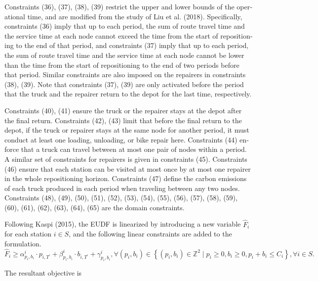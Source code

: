 \documentclass[
  english,
]{article}
\begin{document}
\begin{otherlanguage}{english}
\protect{}\label{p0240}
Constraints (36), (37), (38), (39) restrict the upper and lower bounds of the operational time, and
are modified from the study of Liu et al. (2018). Specifically, constraints (36) imply that up to
each period, the sum of route travel time and the service time at each node cannot exceed the time
from the start of repositioning to the end of that period, and constraints (37) imply that up to
each period, the sum of route travel time and the service time at each node cannot be lower than the
time from the start of repositioning to the end of two periods before that period. Similar
constraints are also imposed on the repairers in constraints (38), (39). Note that constraints (37),
(39) are only activated before the period that the truck and the repairer return to the depot for
the last time, respectively.

\protect{}\label{p0245}
Constraints (40), (41) ensure the truck or the repairer stays at the depot after the final return.
Constraints (42), (43) limit that before the final return to the depot, if the truck or repairer
stays at the same node for another period, it must conduct at least one loading, unloading, or bike
repair here. Constraints (44) enforce that a truck can travel between at most one pair of nodes
within a period. A similar set of constraints for repairers is given in constraints (45).
Constraints (46) ensure that each station can be visited at most once by at most one repairer in the
whole repositioning horizon. Constraints (47) define the carbon emissions of each truck produced in
each period when traveling between any two nodes. Constraints (48), (49), (50), (51), (52), (53),
(54), (55), (56), (57), (58), (59), (60), (61), (62), (63), (64), (65) are the domain constraints.

\protect{}\label{p0250}
Following Kaspi (2015), the EUDF is linearized by introducing a new variable \({\widehat{F}}_{i}\)
for each station \(i \in S\), and the following linear constraints are added to the
formulation.\[\tag{66}{\hat{F}}_{i} \geq \alpha_{p_{i},b_{i}}^{i} \cdot p_{i,T^{'}} + \beta_{p_{i},b_{i}}^{i} \cdot b_{i,T^{'}} + \gamma_{p_{i},b_{i}}^{i},\forall\left( {p_{i},b_{i}} \right) \in \left\{ {\left( {p_{i},b_{i}} \right) \in {\mathbb{Z}}^{2} \mid p_{i} \geq 0,b_{i} \geq 0,p_{i} + b_{i} \leq C_{i}} \right\},\forall i \in S.\]

\protect{}\label{p0255}
The resultant objective is


\end{otherlanguage}
\end{document}
